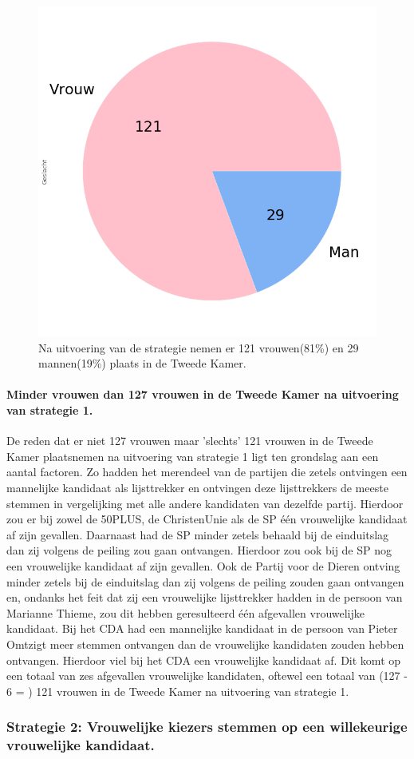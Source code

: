 \begin{figure}[H]
\centering
	\includegraphics[width=0.35\linewidth]{pie_chart_topN.png}

			\caption{Na uitvoering van de strategie nemen er 121 vrouwen(81\%) en 29 mannen(19\%) plaats in de Tweede Kamer.}

\label{fig:pcS1V}
\end{figure}

\paragraph{Minder vrouwen dan 127 vrouwen in de Tweede Kamer na uitvoering van strategie 1.}
De reden dat er niet 127 vrouwen maar 'slechts' 121 vrouwen in de Tweede Kamer plaatsnemen na uitvoering van strategie 1 ligt ten grondslag aan een aantal factoren. Zo hadden het merendeel van de partijen die zetels ontvingen een mannelijke kandidaat als lijsttrekker en ontvingen deze lijsttrekkers de meeste stemmen in vergelijking met alle andere kandidaten van dezelfde partij. Hierdoor zou er bij zowel de 50PLUS, de ChristenUnie als de SP één vrouwelijke kandidaat af zijn gevallen. Daarnaast had de SP minder zetels behaald bij de einduitslag dan zij volgens de peiling zou gaan ontvangen. Hierdoor zou ook bij de SP nog een vrouwelijke kandidaat af zijn gevallen. Ook de Partij voor de Dieren ontving minder zetels bij de einduitslag dan zij volgens de peiling zouden gaan ontvangen en, ondanks het feit dat zij een vrouwelijke lijsttrekker hadden in de persoon van Marianne Thieme, zou dit hebben geresulteerd één afgevallen vrouwelijke kandidaat. Bij het CDA had een mannelijke kandidaat in de persoon van Pieter Omtzigt meer stemmen ontvangen dan de vrouwelijke kandidaten zouden hebben ontvangen. Hierdoor viel bij het CDA een vrouwelijke kandidaat af. Dit komt op een totaal van zes afgevallen vrouwelijke kandidaten, oftewel een totaal van (127 - 6 = ) 121 vrouwen in de Tweede Kamer na uitvoering van strategie 1.  



\subsubsection{Strategie 2: Vrouwelijke kiezers stemmen op een willekeurige vrouwelijke kandidaat.}
